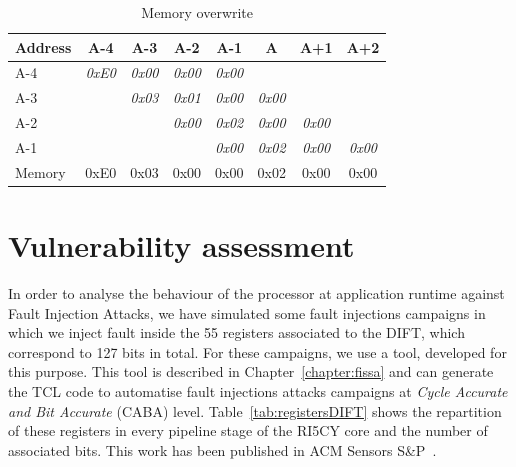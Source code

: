 \begin{table}[t]
    \centering
    \caption{Memory overwrite}
    \label{table:ftpdOverwriteMemory}
    \begin{tabular}{l|ccccccc}
        \toprule
        Address & A-4 & A-3 & A-2 & A-1 & A & A+1 & A+2 \\ \midrule
        A-4     & \textit{0xE0} & \textit{0x00} & \textit{0x00} & \textit{0x00} & \textit{}     & \textit{}     & \textit{}     \\
        A-3     & \textit{}     & \textit{0x03} & \textit{0x01} & \textit{0x00} & \textit{0x00} & \textit{}     & \textit{}     \\
        A-2     & \textit{}     & \textit{}     & \textit{0x00} & \textit{0x02} & \textit{0x00} & \textit{0x00} & \textit{}     \\
        A-1     & \textit{}     & \textit{}     & \textit{}     & \textit{0x00} & \textit{0x02} & \textit{0x00} & \textit{0x00} \\ \midrule
        Memory & {0xE0}    & {0x03}    & 0x00          & 0x00          & 0x02          & 0x00          & 0x00          \\
        \bottomrule
    \end{tabular}
\end{table}


\section{Vulnerability assessment}
\label{section:vuln_assessment}
In order to analyse the behaviour of the processor at application runtime against Fault Injection Attacks, we have simulated some fault injections campaigns in which we inject fault inside the 55 registers associated to the DIFT, which correspond to 127 bits in total. For these campaigns, we use a tool, developed for this purpose. This tool is described in Chapter~\ref{chapter:fissa} and can generate the TCL code to automatise fault injections attacks campaigns at\textit{ Cycle Accurate and Bit Accurate} (CABA) level.
Table~\ref{tab:registersDIFT} shows the repartition of these registers in every pipeline stage of the RI5CY core and the number of associated bits. This work has been published in ACM Sensors S\&P~\cite{PLG-22-SensorsSP}.


